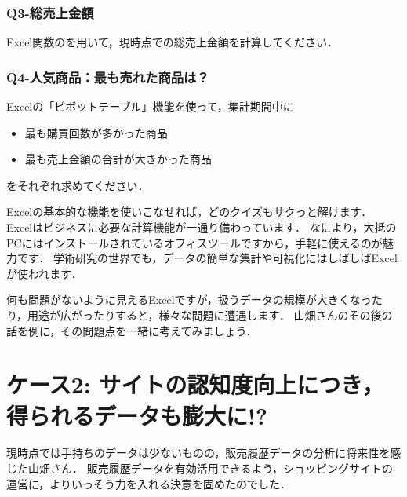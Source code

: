 \subsubsection{Q3-総売上金額}
Excel関数のを用いて，現時点での総売上金額を計算してください．

\subsubsection{Q4-人気商品：最も売れた商品は？}
Excelの「ピボットテーブル」機能を使って，集計期間中に
\begin{itemize}
\item 最も購買回数が多かった商品
\item 最も売上金額の合計が大きかった商品
\end{itemize}
をそれぞれ求めてください．

\vspace{2zw}

Excelの基本的な機能を使いこなせれば，どのクイズもサクっと解けます．
Excelはビジネスに必要な計算機能が一通り備わっています．
なにより，大抵のPCにはインストールされているオフィスツールですから，手軽に使えるのが魅力です．
学術研究の世界でも，データの簡単な集計や可視化にはしばしばExcelが使われます．

何も問題がないように見えるExcelですが，扱うデータの規模が大きくなったり，用途が広がったりすると，様々な問題に遭遇します．
山畑さんのその後の話を例に，その問題点を一緒に考えてみましょう．


\section{ケース2: サイトの認知度向上につき，得られるデータも膨大に!?}
現時点では手持ちのデータは少ないものの，販売履歴データの分析に将来性を感じた山畑さん．
販売履歴データを有効活用できるよう，ショッピングサイトの運営に，よりいっそう力を入れる決意を固めたのでした．

